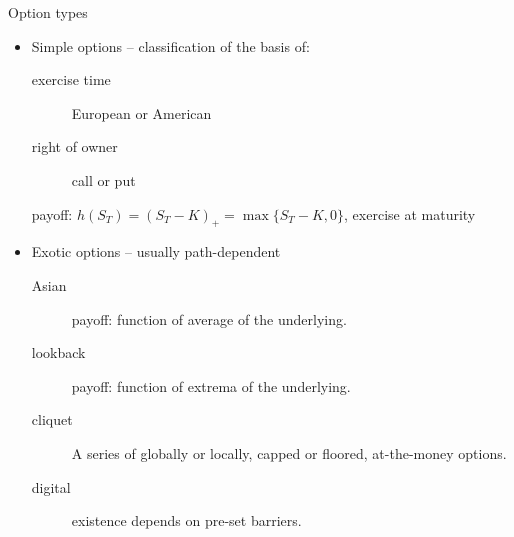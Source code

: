 \documentclass[utf8,t,xcolor=svgnames]{beamer}
\begin{document}
\begin{frame}{Option types}
	\begin{itemize}
		\item Simple options -- classification of the basis of:
		\begin{description}
			\item[exercise time] European or American
			\item[right of owner] call or put
		\end{description}
		\begin{example}
			payoff: $ h(S_T) = (S_T - K)_+ = \max \{S_T - K, 0\} $, exercise at maturity
		\end{example}
		\item Exotic options -- usually path-dependent
		\begin{description}
			\item[\alert{Asian}] payoff: function of average of the underlying.
			\item[lookback] payoff: function of extrema of the underlying.
			\item[\alert{cliquet}] A series of globally or locally, capped or floored, at-the-money options.
			\item[digital] existence depends on pre-set barriers.
		\end{description}
	\end{itemize}
\end{frame}
\end{document}
